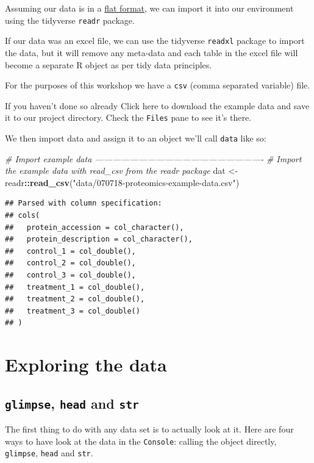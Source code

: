 \documentclass[12pt,]{book}
\newenvironment{Shaded}{\begin{snugshade}}{\end{snugshade}}
\newcommand{\KeywordTok}[1]{\textcolor[rgb]{0.13,0.29,0.53}{\textbf{#1}}}
\newcommand{\StringTok}[1]{\textcolor[rgb]{0.31,0.60,0.02}{#1}}
\newcommand{\CommentTok}[1]{\textcolor[rgb]{0.56,0.35,0.01}{\textit{#1}}}
\newcommand{\OperatorTok}[1]{\textcolor[rgb]{0.81,0.36,0.00}{\textbf{#1}}}
\newcommand{\NormalTok}[1]{#1}
\theoremstyle{definition}
\theoremstyle{definition}
\theoremstyle{definition}
\theoremstyle{remark}
\begin{document}
Assuming our data is in a \protect\hyperlink{file-formats}{flat format},
we can import it into our environment using the tidyverse \texttt{readr}
package.

If our data was an excel file, we can use the tidyverse \texttt{readxl}
package to import the data, but it will remove any meta-data and each
table in the excel file will become a separate R object as per tidy data
principles.

For the purposes of this workshop we have a \texttt{csv} (comma
separated variable) file.

If you haven't done so already Click here to download the example data
and save it to our project directory. Check the \texttt{Files} pane to
see it's there.

We then import data and assign it to an object we'll call \texttt{data}
like so:

\begin{Shaded}
\begin{Highlighting}[]
\CommentTok{# Import example data ----------------------------------------------------------}
\CommentTok{# Import the example data with read_csv from the readr package}
\NormalTok{dat <-}\StringTok{ }\NormalTok{readr}\OperatorTok{::}\KeywordTok{read_csv}\NormalTok{(}\StringTok{"data/070718-proteomics-example-data.csv"}\NormalTok{)}
\end{Highlighting}
\end{Shaded}

\begin{verbatim}
## Parsed with column specification:
## cols(
##   protein_accession = col_character(),
##   protein_description = col_character(),
##   control_1 = col_double(),
##   control_2 = col_double(),
##   control_3 = col_double(),
##   treatment_1 = col_double(),
##   treatment_2 = col_double(),
##   treatment_3 = col_double()
## )
\end{verbatim}

\section{Exploring the data}\label{exploring-the-data}

\subsection{\texorpdfstring{\texttt{glimpse}, \texttt{head} and
\texttt{str}}{glimpse, head and str}}\label{glimpse-head-and-str}

The first thing to do with any data set is to actually look at it. Here
are four ways to have look at the data in the \texttt{Console}: calling
the object directly, \texttt{glimpse}, \texttt{head} and \texttt{str}.
\end{document}
